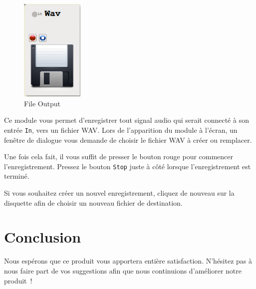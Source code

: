 \documentclass[a4paper,oneside,frenchb,10pt]{article}
\begin{document}
\begin{multicols}{2}
\begin{figure}[H]
\centering
\includegraphics[width=3cm]{../img/png/wavrecorder.png}
\caption{File Output}
\end{figure}

Ce module vous permet d'enregistrer tout signal audio qui serait
connecté à son entrée \verb!In!, vers un fichier WAV. Lors de
l'apparition du module à l'écran, un fenêtre de dialogue vous demande de
choisir le fichier WAV à créer ou remplacer.

Une fois cela fait, il vous
suffit de presser le bouton rouge pour commencer l'enregistrement.
Pressez le bouton \verb!Stop! juste à côté lorsque l'enregistrement est
terminé.

Si vous souhaitez créer un nouvel enregistrement, cliquez de nouveau sur
la disquette afin de choisir un nouveau fichier de destination.

\end{multicols}

\section{Conclusion}

Nous espérons que ce produit vous apportera entière satisfaction.
N'hésitez pas à nous faire part de vos suggestions afin que nous
continuions d'améliorer notre produit~!
\end{document}
